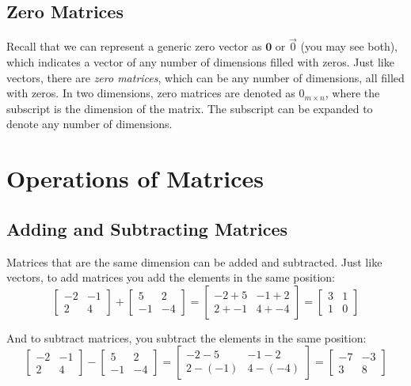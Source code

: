 \subsection{Zero Matrices}
Recall that we can represent a generic zero vector as $\textbf{0}$ or $\vec{0}$ (you may see both), which
indicates a vector of any number of dimensions filled with zeros. Just like
vectors, there are \textit{zero matrices}, which can be any number of dimensions, all filled with zeros. 
In two dimensions, zero matrices are denoted as $\mathbf{\mathit{0}}_{m \times n}$, where the
subscript is the dimension of the matrix. The subscript can be expanded to
denote any number of dimensions.

\section{Operations of Matrices}
\subsection{Adding and Subtracting Matrices}
Matrices that are the same dimension can be added and subtracted. Just like
vectors, to add matrices you add the elements in the same position:
$$\begin{bmatrix}
-2 & -1\\
2 & 4
\end{bmatrix}
+ \begin{bmatrix}
5 & 2\\
-1 & -4
\end{bmatrix}
= \begin{bmatrix}
-2 + 5 & -1 + 2\\
2 + -1 & 4 + -4
\end{bmatrix} =
\begin{bmatrix}
3 & 1\\
1 & 0
\end{bmatrix}$$

And to subtract matrices, you subtract the elements in the same position:
$$\begin{bmatrix}
-2 & -1\\
2 & 4
\end{bmatrix}
- \begin{bmatrix}
5 & 2\\
-1 & -4
\end{bmatrix}
= \begin{bmatrix}
-2 - 5 & -1 - 2\\
2 - (-1) & 4 - (-4)
\end{bmatrix} =
\begin{bmatrix}
-7 & -3\\
3 & 8
\end{bmatrix}$$

